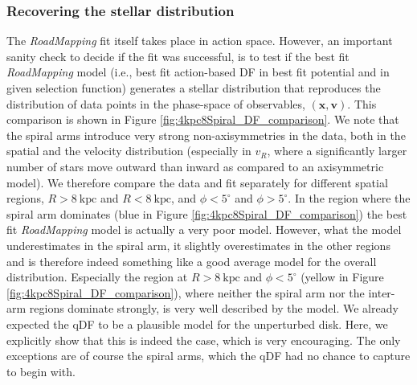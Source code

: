 \documentclass[iop,revtex4,numberedappendix,appendixfloats]{emulateapj}
\newcommand{\vect}[1]{\boldsymbol{#1}}
\newcommand{\RM}{{\sl RoadMapping}}
\begin{document}
\subsubsection{Recovering the stellar distribution} \label{sec:4kpc8Spiral_DF}

The \RM{} fit itself takes place in action space. However, an important sanity check to decide if the fit was successful, is to test if the best fit \RM{} model (i.e., best fit action-based DF in best fit potential and in given selection function) generates a stellar distribution that reproduces the distribution of data points in the phase-space of observables, $(\vect{x},\vect{v})$. This comparison is shown in Figure \ref{fig:4kpc8Spiral_DF_comparison}. 
We note that the spiral arms introduce very strong non-axisymmetries in the data, both in the spatial and the velocity distribution (especially in $v_R$, where a significantly larger number of stars move outward than inward as compared to an axisymmetric model). We therefore compare the data and fit separately for different spatial regions, $R>8~\text{kpc}$ and $R<8~\text{kpc}$, and $\phi<5^\circ$ and $\phi>5^\circ$. In the region where the spiral arm dominates (blue in Figure \ref{fig:4kpc8Spiral_DF_comparison}) the best fit \RM{} model is actually a very poor model. However, what the model underestimates in the spiral arm, it slightly overestimates in the other regions and is therefore indeed something like a good average model for the overall distribution. Especially the region at $R>8~\text{kpc}$ and $\phi<5^\circ$ (yellow in Figure \ref{fig:4kpc8Spiral_DF_comparison}), where neither the spiral arm nor the inter-arm regions dominate strongly, is very well described by the model. We already expected the qDF to be a plausible model for the unperturbed disk. Here, we explicitly show that this is indeed the case, which is very encouraging. The only exceptions are of course the spiral arms, which the qDF had no chance to capture to begin with.
\end{document}

